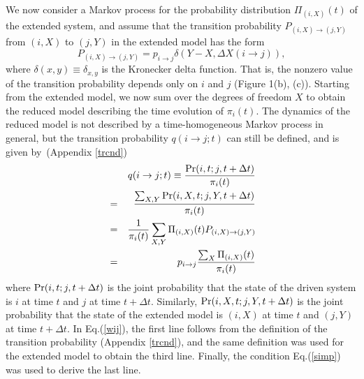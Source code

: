 \documentclass[aps,pre,amsmath,amssymb,floatfix,preprint,nofootinbib]{revtex4}
\begin{document}
We now consider a Markov process for the probability distribution $\Pi_{(i,X)}(t)$ of the extended system, and assume that the transition probability $P_{(i,X) \to (j,Y)}$ from $(i,X)$ to $(j,Y)$ in the extended model has the form
\begin{equation}
P_{(i,X) \to (j,Y)} = p_{i \to j}\delta(Y-X,\Delta X(i \to j)),  \label{simp}
\end{equation}
where $\delta(x,y) \equiv \delta_{x,y}$ is the Kronecker delta function. That is, the nonzero value of the transition probability depends only on $i$ and $j$ (Figure 1(b), (c)). Starting from the extended model, we now sum over the degrees of freedom $X$ to obtain the reduced model describing the time evolution of $\pi_i(t)$. The dynamics of the reduced model is not described by a time-homogeneous Markov process in general, but the transition probability $q(i \to j; t)$ can still be defined, and is given by~(Appendix \ref{trcnd})
\begin{eqnarray}
&&q(i \to j; t) \equiv \frac{{\rm Pr}(i,t; j,t+\Delta t)}{\pi_i(t)}  \nonumber\\
&=& \frac{ \sum_{X,Y}{\rm Pr}(i,X,t; j,Y,t + \Delta t)}{\pi_i(t)}\nonumber\\
&=& \frac{1}{\pi_i(t)}\sum_{X,Y} \Pi_{(i,X)}(t) P_{(i,X) \to (j,Y)}
\nonumber\\
&=& p_{i \to j} \frac{\sum_{X} \Pi_{(i,X)}(t)}{\pi_i(t)} \label{wij}
\end{eqnarray}
where ${\rm Pr}(i,t; j,t+\Delta t)$ is the joint probability that the state of the driven system is $i$ at time $t$ and $j$ at time $t+ \Delta t$. Similarly, ${\rm Pr}(i,X,t; j,Y,t+\Delta t)$ is the joint probability that the state of the extended model is $(i,X)$ at time $t$ and $(j,Y)$ at time $t+\Delta t$.
In Eq.(\ref{wij}), the first line follows from the definition of the  transition probability (Appendix \ref{trcnd}), and the same definition was used for the extended model to obtain the third line. Finally, the condition Eq.(\ref{simp}) was used to derive the last line.
\end{document}
